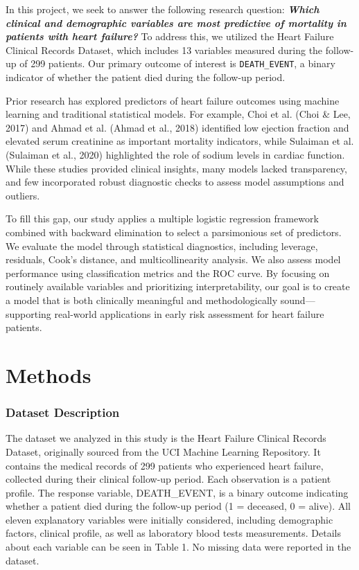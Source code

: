 \documentclass[
  letterpaper,
  DIV=11,
  numbers=noendperiod]{scrartcl}
\begin{document}
In this project, we seek to answer the following research question:
\textbf{\emph{Which clinical and demographic variables are most
predictive of mortality in patients with heart failure?}} To address
this, we utilized the Heart Failure Clinical Records Dataset, which
includes 13 variables measured during the follow-up of 299 patients. Our
primary outcome of interest is \texttt{DEATH\_EVENT}, a binary indicator
of whether the patient died during the follow-up period.

Prior research has explored predictors of heart failure outcomes using
machine learning and traditional statistical models. For example, Choi
et al. (Choi \& Lee, 2017) and Ahmad et al. (Ahmad et al., 2018)
identified low ejection fraction and elevated serum creatinine as
important mortality indicators, while Sulaiman et al. (Sulaiman et al.,
2020) highlighted the role of sodium levels in cardiac function. While
these studies provided clinical insights, many models lacked
transparency, and few incorporated robust diagnostic checks to assess
model assumptions and outliers.

To fill this gap, our study applies a multiple logistic regression
framework combined with backward elimination to select a parsimonious
set of predictors. We evaluate the model through statistical
diagnostics, including leverage, residuals, Cook's distance, and
multicollinearity analysis. We also assess model performance using
classification metrics and the ROC curve. By focusing on routinely
available variables and prioritizing interpretability, our goal is to
create a model that is both clinically meaningful and methodologically
sound---supporting real-world applications in early risk assessment for
heart failure patients.

\hypertarget{methods}{%
\section{Methods}\label{methods}}

\hypertarget{dataset-description}{%
\subsubsection{Dataset Description}\label{dataset-description}}

The dataset we analyzed in this study is the Heart Failure Clinical
Records Dataset, originally sourced from the UCI Machine Learning
Repository. It contains the medical records of 299 patients who
experienced heart failure, collected during their clinical follow-up
period. Each observation is a patient profile. The response variable,
DEATH\_EVENT, is a binary outcome indicating whether a patient died
during the follow-up period (1 = deceased, 0 = alive). All eleven
explanatory variables were initially considered, including demographic
factors, clinical profile, as well as laboratory blood tests
measurements. Details about each variable can be seen in Table 1. No
missing data were reported in the dataset.
\end{document}
